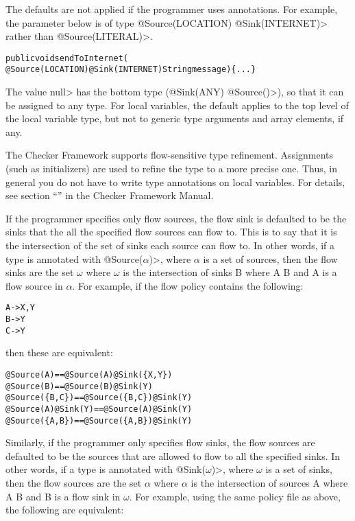 The defaults are not applied if the programmer uses annotations.  For
example, the parameter below is of type
\<@Source(LOCATION) @Sink(INTERNET)>
rather than  \<@Source({LITERAL})>.

\begin{alltt}
public void sendToInternet(
    @Source(LOCATION) @Sink(INTERNET) String message)\{...\}
\end{alltt} 

The value \<null> has the bottom type (\<@Sink(ANY)
@Source(\ttcbs)>),
so that it can be assigned to any type. For local variables, the
default applies to the top level of the local variable type, but not
to generic type arguments and array elements, if any.

The Checker Framework supports flow-sensitive type refinement.  Assignments (such as
initializers) are used to refine the type to a more precise one.  Thus, in
general you do not have to write type annotations on local variables.  For
details, see section ``'' in the Checker Framework Manual.

If the programmer specifies only flow sources, the flow sink is defaulted
to be the
sinks that the all the specified flow sources can flow to. This is to say that 
it is the intersection of the set of sinks each source can flow to.
 In other words, if a type is annotated with 
\<@Source($\alpha$)>, where $\alpha$ is a set of sources, then the flow sinks are the set 
$\omega$ where $\omega$ is the intersection of sinks B where A \flowsto{} B and A is a flow source in 
$\alpha$.  For example, if the flow policy contains the following:

\begin{alltt}
  A -> X,Y
  B -> Y
  C -> Y
\end{alltt}
  
\noindent 
then these are equivalent:

\begin{alltt}
  @Source(A)                 ==   @Source(A) @Sink(\{X, Y\})
  @Source(B)                 ==   @Source(B) @Sink(Y)
  @Source(\{B,C\})             ==   @Source(\{B,C\}) @Sink(Y)
  @Source(A) @Sink(Y)   ==   @Source(A) @Sink(Y) 
  @Source(\{A,B\})             ==   @Source(\{A,B\}) @Sink(Y)
\end{alltt}


Similarly, if the programmer only specifies flow sinks, the flow sources are defaulted to be the sources 
that are allowed to flow to all the specified sinks.  In other words, if a type is annotated with 
\<@Sink($\omega$)>, where $\omega$ is a set of sinks, then the flow sources are the set 
$\alpha$ where $\alpha$ is the intersection of sources A where A \flowsto{} B and B is a flow sink in 
$\omega$. For example, using the same policy file as above, the following are equivalent:

